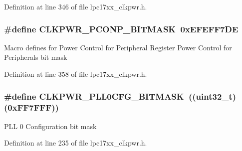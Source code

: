 \-Definition at line 346 of file lpc17xx\-\_\-clkpwr.\-h.

\hypertarget{group___c_l_k_p_w_r___private___macros_gaf50970fcbb5758ba9699c016114ae066}{
\subsubsection[{\-C\-L\-K\-P\-W\-R\-\_\-\-P\-C\-O\-N\-P\-\_\-\-B\-I\-T\-M\-A\-S\-K}]{\setlength{\rightskip}{0pt plus 5cm}\#define {\bf \-C\-L\-K\-P\-W\-R\-\_\-\-P\-C\-O\-N\-P\-\_\-\-B\-I\-T\-M\-A\-S\-K}~0x\-E\-F\-E\-F\-F7\-D\-E}}\label{group___c_l_k_p_w_r___private___macros_gaf50970fcbb5758ba9699c016114ae066}
\-Macro defines for \-Power \-Control for \-Peripheral \-Register \-Power \-Control for \-Peripherals bit mask 

\-Definition at line 358 of file lpc17xx\-\_\-clkpwr.\-h.

\hypertarget{group___c_l_k_p_w_r___private___macros_ga71d49ff2380fd0026cd20c2039558ddc}{
\subsubsection[{\-C\-L\-K\-P\-W\-R\-\_\-\-P\-L\-L0\-C\-F\-G\-\_\-\-B\-I\-T\-M\-A\-S\-K}]{\setlength{\rightskip}{0pt plus 5cm}\#define {\bf \-C\-L\-K\-P\-W\-R\-\_\-\-P\-L\-L0\-C\-F\-G\-\_\-\-B\-I\-T\-M\-A\-S\-K}~((uint32\-\_\-t)(0x\-F\-F7\-F\-F\-F))}}\label{group___c_l_k_p_w_r___private___macros_ga71d49ff2380fd0026cd20c2039558ddc}
\-P\-L\-L 0 \-Configuration bit mask 

\-Definition at line 235 of file lpc17xx\-\_\-clkpwr.\-h.

